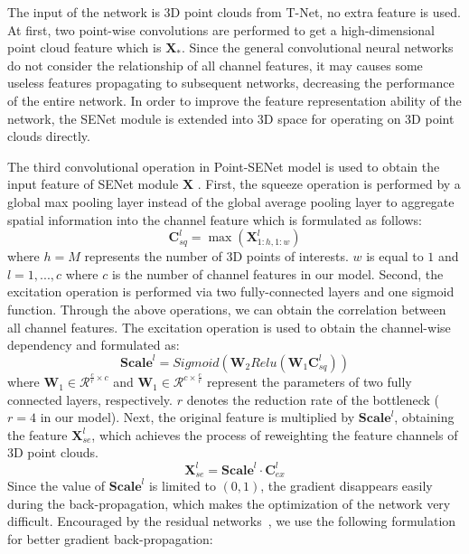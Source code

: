 \documentclass[letterpaper]{article}
\begin{document}
The input of the network is 3D point clouds from T-Net, no extra feature is used. At first, two point-wise convolutions are performed to get a high-dimensional point cloud feature which is $\mathbf{X_*}$. Since the general convolutional neural networks do not consider the relationship of all channel features, it may causes some useless features propagating to subsequent networks, decreasing the performance of the entire network. In order to improve the feature representation ability of the network, the SENet module is extended into 3D space for operating on 3D point clouds directly.

The third convolutional operation in Point-SENet model is used to obtain the input feature of SENet module $\mathbf{X}$ . First, the squeeze operation is performed by a global max pooling layer instead of the global average pooling layer to aggregate spatial information into the channel feature which is formulated as follows:
\begin{equation}
\mathbf{C}_{sq}^l = \max (\mathbf{X}_{1:h,1:w}^l)
\end{equation}
where $h=M$ represents the number of 3D points of interests. $w$ is equal to $1$ and $l={1,...,c}$ where $c$ is the number of channel features in our model. Second, the excitation operation is performed via  two fully-connected layers and one sigmoid function. Through the above operations, we can obtain the correlation between all channel features. The excitation operation is used to obtain the channel-wise dependency and formulated as:
\begin{equation}
\mathbf{Scale}^l = Sigmoid(\mathbf{W}_2Relu(\mathbf{W}_1\mathbf{C}_{sq}^l))
\end{equation}
where $\mathbf{W}_1 \in \mathcal{R}^{\frac{c}{r}\times{c}}$  and $\mathbf{W}_1 \in \mathcal{R}^{c \times \frac{c}{r}}$ represent the parameters of two fully connected layers, respectively. $r$ denotes the reduction rate of the bottleneck ($r=4$ in our model). Next, the original feature is multiplied by $\mathbf{Scale}^l$, obtaining the feature $\mathbf{X}_{se}^l$, which achieves the process of reweighting the feature channels of 3D point clouds.
\begin{equation}
\mathbf{X}_{se}^l = \mathbf{Scale}^l \cdot \mathbf{C}_{ex}^l
\end{equation}
Since the value of $\mathbf{Scale}^l$ is limited to $(0,1)$, the gradient disappears easily during the back-propagation, which makes the optimization of the network very difficult. Encouraged by the residual networks~\cite{he2016deep}, we use the following formulation for better gradient back-propagation:
\end{document}
